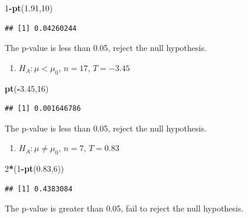 \documentclass[
]{book}
\newenvironment{Shaded}{\begin{snugshade}}{\end{snugshade}}
\newcommand{\DecValTok}[1]{\textcolor[rgb]{0.00,0.00,0.81}{#1}}
\newcommand{\FloatTok}[1]{\textcolor[rgb]{0.00,0.00,0.81}{#1}}
\newcommand{\KeywordTok}[1]{\textcolor[rgb]{0.13,0.29,0.53}{\textbf{#1}}}
\newcommand{\NormalTok}[1]{#1}
\newcommand{\OperatorTok}[1]{\textcolor[rgb]{0.81,0.36,0.00}{\textbf{#1}}}
\providecommand{\tightlist}{%
  \setlength{\itemsep}{0pt}\setlength{\parskip}{0pt}}
\begin{document}
\begin{Shaded}
\begin{Highlighting}[]
\DecValTok{1}\OperatorTok{-}\KeywordTok{pt}\NormalTok{(}\FloatTok{1.91}\NormalTok{,}\DecValTok{10}\NormalTok{)}
\end{Highlighting}
\end{Shaded}

\begin{verbatim}
## [1] 0.04260244
\end{verbatim}

The p-value is less than 0.05, reject the null hypothesis.

\begin{enumerate}
\def\labelenumi{\alph{enumi}.}
\setcounter{enumi}{1}
\tightlist
\item
  \(H_{A}: \mu < \mu_{0}\), \(n = 17\), \(T = - 3.45\)
\end{enumerate}

\begin{Shaded}
\begin{Highlighting}[]
\KeywordTok{pt}\NormalTok{(}\OperatorTok{-}\FloatTok{3.45}\NormalTok{,}\DecValTok{16}\NormalTok{)}
\end{Highlighting}
\end{Shaded}

\begin{verbatim}
## [1] 0.001646786
\end{verbatim}

The p-value is less than 0.05, reject the null hypothesis.

\begin{enumerate}
\def\labelenumi{\alph{enumi}.}
\setcounter{enumi}{2}
\tightlist
\item
  \(H_{A}: \mu \ne \mu_{0}\), \(n = 7\), \(T = 0.83\)
\end{enumerate}

\begin{Shaded}
\begin{Highlighting}[]
\DecValTok{2}\OperatorTok{*}\NormalTok{(}\DecValTok{1}\OperatorTok{-}\KeywordTok{pt}\NormalTok{(}\FloatTok{0.83}\NormalTok{,}\DecValTok{6}\NormalTok{))}
\end{Highlighting}
\end{Shaded}

\begin{verbatim}
## [1] 0.4383084
\end{verbatim}

The p-value is greater than 0.05, fail to reject the null hypothesis.
\end{document}

